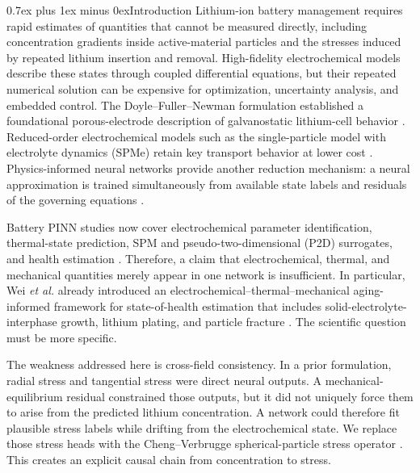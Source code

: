 \documentclass[conference]{IEEEtran}
\makeatletter
\newcommand{\headingfont}{\rmfamily}
\def\section{\@startsection{section}{1}{\z@}{1.5ex plus 1.5ex minus 0.5ex}%
{0.7ex plus 1ex minus 0ex}{\normalfont\headingfont\large\centering\bfseries}}
\makeatother
\begin{document}
\section{Introduction}
Lithium-ion battery management requires rapid estimates of quantities that cannot be measured directly, including concentration gradients inside active-material particles and the stresses induced by repeated lithium insertion and removal. High-fidelity electrochemical models describe these states through coupled differential equations, but their repeated numerical solution can be expensive for optimization, uncertainty analysis, and embedded control. The Doyle--Fuller--Newman formulation established a foundational porous-electrode description of galvanostatic lithium-cell behavior \cite{doyle1993dfn}. Reduced-order electrochemical models such as the single-particle model with electrolyte dynamics (SPMe) retain key transport behavior at lower cost \cite{marquis2019spme,richardson2020gspm,planella2022continuum}. Physics-informed neural networks provide another reduction mechanism: a neural approximation is trained simultaneously from available state labels and residuals of the governing equations \cite{raissi2019pinn}.

Battery PINN studies now cover electrochemical parameter identification, thermal-state prediction, SPM and pseudo-two-dimensional (P2D) surrogates, and health estimation \cite{hassanaly2024part1,hassanaly2024part2,wang2023temperature,wang2024parameter}. Therefore, a claim that electrochemical, thermal, and mechanical quantities merely appear in one network is insufficient. In particular, Wei \emph{et al.} already introduced an electrochemical--thermal--mechanical aging-informed framework for state-of-health estimation that includes solid-electrolyte-interphase growth, lithium plating, and particle fracture \cite{wei2026etm}. The scientific question must be more specific.

The weakness addressed here is cross-field consistency. In a prior formulation, radial stress and tangential stress were direct neural outputs. A mechanical-equilibrium residual constrained those outputs, but it did not uniquely force them to arise from the predicted lithium concentration. A network could therefore fit plausible stress labels while drifting from the electrochemical state. We replace those stress heads with the Cheng--Verbrugge spherical-particle stress operator \cite{cheng2009stress}. This creates an explicit causal chain from concentration to stress.
\end{document}
